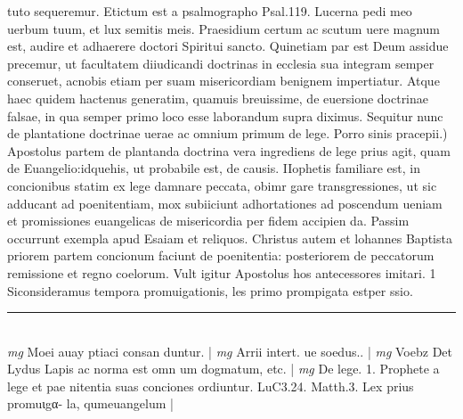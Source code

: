 \documentclass{article}
\begin{document}
\begin{pages}
tuto sequeremur. Etictum est a psalmographo Psal.119. Lucerna pedi meo uerbum tuum, et lux semitis meis. Praesidium certum ac scutum uere magnum est, audire et adhaerere doctori Spiritui sancto. Quinetiam par est Deum assidue precemur, ut facultatem diiudicandi doctrinas in ecclesia sua integram semper conseruet, acnobis etiam per suam misericordiam benignem impertiatur. Atque haec quidem hactenus generatim, quamuis breuissime, de euersione doctrinae falsae, in qua semper primo loco esse laborandum supra diximus. Sequitur nunc de plantatione doctrinae uerae ac omnium primum de lege.  \pend\pstart Porro sinis pracepii.) Apostolus partem de plantanda doctrina vera ingrediens de lege prius agit, quam de Euangelio:idquehis, ut probabile est, de causis.  \pend{} IIophetis familiare est, in concionibus statim ex lege damnare peccata, obimr gare transgressiones, ut sic adducant ad poenitentiam, mox subiiciunt adhortationes ad poscendum ueniam et promissiones euangelicas de misericordia per fidem accipien da. Passim occurrunt exempla apud Esaiam et reliquos. Christus autem et lohannes Baptista priorem partem concionum faciunt de poenitentia: posteriorem de peccatorum remissione et regno coelorum. Vult igitur Apostolus hos antecessores imitari. 1 Siconsideramus tempora promuigationis, les primo prompigata estper ssio.  \pend
\vspace{0.5cm}\noindent
\vspace{0.2cm}\rule{1cm}{0.2pt}\\ 
\hspace{0.2cm}\textit{mg}
\footnotesize Moei auay ptiaci consan duntur. 
\normalsize| 
\hspace{0.2cm}\textit{mg}
\footnotesize Arrii intert. ue soedus.. 
\normalsize| 
\hspace{0.2cm}\textit{mg}
\footnotesize Voebz Det Lydus Lapis ac norma est omn um dogmatum, etc. 
\normalsize| 
\hspace{0.2cm}\textit{mg}
\footnotesize De lege. 1. Prophete a lege et pae nitentia suas conciones ordiuntur. LuC3.24. Matth.3. Lex prius promuιgα- la, qumeuangelum 
\normalsize| 

\end{pages}
\end{document}
